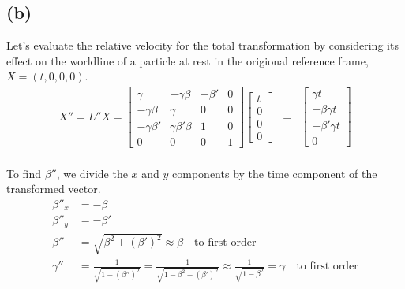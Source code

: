 \documentclass[11pt]{amsart}
\begin{document}
\subsection*{(b)} Let's evaluate the relative velocity for the total transformation by considering its effect on the worldline of a particle at rest in the origional reference frame, $X=(t, 0, 0, 0)$. \\
\begin{eqnarray*}
X'' = L'' X = 
 \begin{bmatrix}
	\gamma & -\gamma \beta & - \beta' & 0 \\
	- \gamma \beta & \gamma & 0 & 0 \\
	- \gamma \beta' & \gamma \beta' \beta & 1 & 0 \\
	0 & 0 & 0 & 1 
	\end{bmatrix} 
	\begin{bmatrix}
	t \\
	0 \\
	0 \\
	0 
	\end{bmatrix} &=& \begin{bmatrix}
	\gamma t \\
	- \beta \gamma t \\
	- \beta' \gamma t \\
	0 
	\end{bmatrix}
	\end{eqnarray*} \\
To find $\beta''$, we divide the $x$ and $y$ components by the time component of the transformed vector. \\
\begin{align*}
\beta''_{x} & = - \beta \\
\beta''_{y} & = - \beta' \\
\beta'' & = \sqrt{\beta^2 + (\beta')^2} \approx \beta \quad \text{to first order} \\
\gamma'' & = \frac{1}{\sqrt{1 - (\beta'')^2}} = \frac{1}{\sqrt{1 - \beta^2 - (\beta')^2}} \approx \frac{1}{\sqrt{1 - \beta^2}} = \gamma \quad \text{to first order}
\end{align*}
\end{document}
